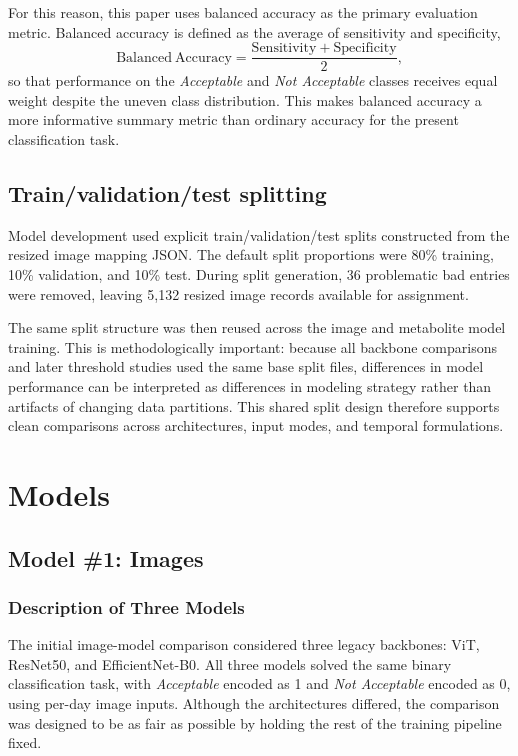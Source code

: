 \documentclass{article}
\begin{document}
For this reason, this paper uses balanced accuracy as the primary evaluation metric. Balanced accuracy is defined as the average of sensitivity and specificity,
\[
\mathrm{Balanced\ Accuracy}=\frac{\mathrm{Sensitivity}+\mathrm{Specificity}}{2},
\]
so that performance on the \textit{Acceptable} and \textit{Not Acceptable} classes receives equal weight despite the uneven class distribution. This makes balanced accuracy a more informative summary metric than ordinary accuracy for the present classification task.

\subsection{Train/validation/test splitting}

Model development used explicit train/validation/test splits constructed from the resized image mapping JSON. The default split proportions were 80\% training, 10\% validation, and 10\% test. During split generation, 36 problematic bad entries were removed, leaving 5,132 resized image records available for assignment.

The same split structure was then reused across the image and metabolite model training. This is methodologically important: because all backbone comparisons and later threshold studies used the same base split files, differences in model performance can be interpreted as differences in modeling strategy rather than artifacts of changing data partitions. This shared split design therefore supports clean comparisons across architectures, input modes, and temporal formulations. 

\section{Models}
\subsection{Model \#1: Images}

\subsubsection{Description of Three Models}

The initial image-model comparison considered three legacy backbones: ViT, ResNet50, and EfficientNet-B0. All three models solved the same binary classification task, with \textit{Acceptable} encoded as 1 and \textit{Not Acceptable} encoded as 0, using per-day image inputs. Although the architectures differed, the comparison was designed to be as fair as possible by holding the rest of the training pipeline fixed.
\end{document}
